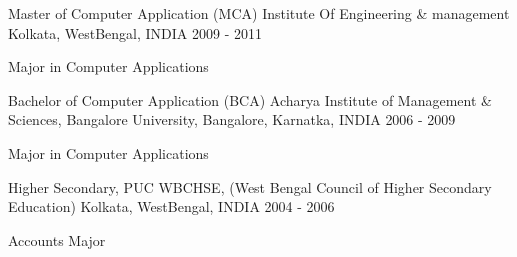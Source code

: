\begin{cventries}

  \cventry
    {Master of Computer Application (MCA)} %
    {Institute Of Engineering \& management} %
    {Kolkata, WestBengal, INDIA} %
    {2009 - 2011} %
    {
      \begin{cvitems} %
        \item {Major in Computer Applications}
      \end{cvitems}
    }

  \cventry
    {Bachelor of Computer Application (BCA)} %
    {Acharya Institute of Management \& Sciences, Bangalore University,} %
    {Bangalore, Karnatka, INDIA} %
    {2006 - 2009} %
     {
      \begin{cvitems} %
        \item {Major in Computer Applications}
      \end{cvitems}
    }

  \cventry
    {Higher Secondary, PUC} %
    {WBCHSE, (West Bengal Council of Higher Secondary Education)} %
    {Kolkata, WestBengal, INDIA} %
    {2004 - 2006} %
     {
      \begin{cvitems} %
        \item {Accounts Major}
      \end{cvitems}
    }

\end{cventries}
